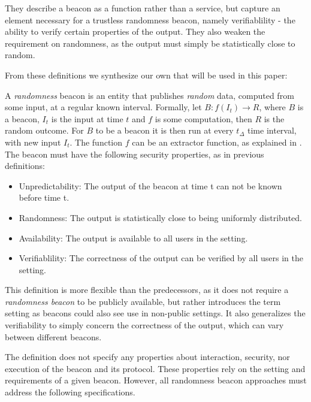 They describe a beacon as a function rather than a service, but capture an element necessary for a trustless randomness beacon, namely verifiablility - the ability to verify certain properties of the output. They also weaken the requirement on randomness, as the output must simply be statistically close to random. 

From these definitions we synthesize our own that will be used in this paper: 

A \emph{randomness} beacon is an entity that publishes \emph{random} data, computed from some input, at a regular known interval.
Formally, let $B: f(I_t) \rightarrow R$, where $B$ is a beacon, $I_t$ is the input at time $t$ and $f$ is some computation, then $R$ is the random outcome.
For $B$ to be a beacon it is then run at every $t_\Delta$ time interval, with new input $I_t$.
The function $f$ can be an extractor function, %
as explained in .
The beacon must have the following security properties, as in previous definitions: 

\begin{itemize}
    \item Unpredictability: The output of the beacon at time t can not be known before time t. 
    \item Randomness: The output is statistically close to being uniformly distributed. 
    \item Availability: The output is available to all users in the setting. 
    \item Verifiablility: The correctness of the output can be verified by all users in the setting.  
\end{itemize}

This definition is more flexible than the predecessors, as it does not require a \emph{randomness beacon} to be publicly available, but rather introduces the term setting as beacons could also see use in non-public settings. It also generalizes the verifiability to simply concern the correctness of the output, which can vary between different beacons. 

The definition does not specify any properties about interaction, security, nor execution of the beacon and its protocol.
These properties rely on the setting and requirements of a given beacon.
However, all randomness beacon approaches must address the following specifications.



